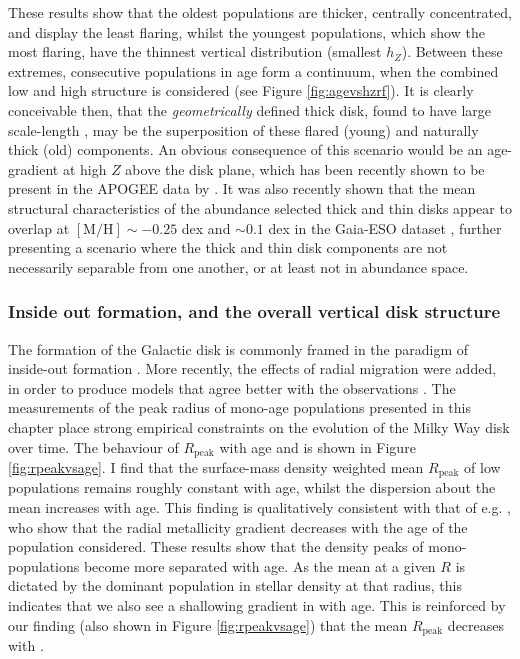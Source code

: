 These results show that the oldest populations are thicker, centrally concentrated, and display the least flaring, whilst the youngest populations, which show the most flaring, have the thinnest vertical distribution (smallest $h_Z$). Between these extremes, consecutive populations in age form a continuum, when the combined low and high \afe{} structure is considered (see Figure \ref{fig:agevshzrf}). It is clearly conceivable then, that the \emph{geometrically} defined thick disk, found to have large scale-length \citep[e.g.,][]{2013MNRAS.431..930J,2008ApJ...673..864J}, may be the superposition of these flared (young) and naturally thick (old) components. An obvious consequence of this scenario would be an age-gradient at high $Z$ above the disk plane, which has been recently shown to be present in the APOGEE data by \citet{2016arXiv160901168M}. It was also recently shown that the mean structural characteristics of the abundance selected thick and thin disks appear to overlap at $\mathrm{[M/H]}\sim-0.25$ dex and \afe{} $\sim 0.1$ dex in the Gaia-ESO dataset \citep{2014A&A...567A...5R}, further presenting a scenario where the thick and thin disk components are not necessarily separable from one another, or at least not in abundance space. 

\subsubsection{Inside out formation, and the overall vertical disk structure}
The formation of the Galactic disk is commonly framed in the paradigm of inside-out formation \citep[e.g.,][]{2013ApJ...773...43B,2011ApJ...729...16K,1976MNRAS.176...31L,1989MNRAS.239..885M}. More recently, the effects of radial migration  \citep[e.g.][]{2002MNRAS.336..785S} were added, in order to produce models that agree better with the observations \citep[e.g.][]{2011ApJ...737....8L,2009MNRAS.396..203S,2015ApJ...802..129S,2015A&A...580A.126K} . The measurements of the peak radius of mono-age populations  presented in this chapter place strong empirical constraints on the evolution of the Milky Way disk over time. The behaviour of $R_{\mathrm{peak}}$ with age and \feh{} is shown in Figure \ref{fig:rpeakvsage}. I find that the surface-mass density weighted mean $R_{\mathrm{peak}}$ of low \afe{} populations remains roughly constant with age, whilst the dispersion about the mean increases with age. This finding is qualitatively consistent with that of e.g. \citet{2016arXiv160804951A}, who show that the radial metallicity gradient decreases with the age of the population considered. These results show that the density peaks of mono-\feh{} populations become more separated with age. As the mean \feh{} at a given $R$ is dictated by the dominant population in stellar density at that radius, this indicates that we also see a shallowing gradient in \feh{} with age. This is reinforced by our finding (also shown in Figure \ref{fig:rpeakvsage}) that the mean $R_{\mathrm{peak}}$ decreases with \feh{}.

